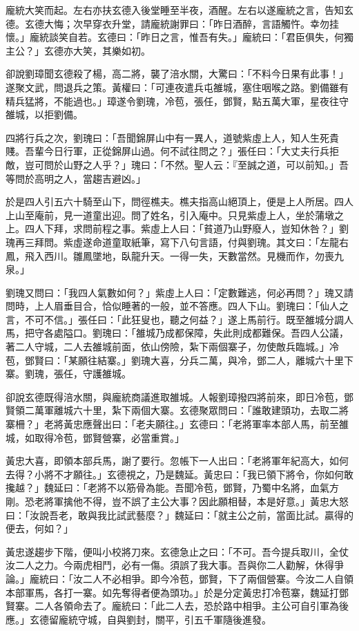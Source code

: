 龐統大笑而起。左右亦扶玄德入後堂睡至半夜，酒醒。左右以遂龐統之言，告知玄德。玄德大悔；次早穿衣升堂，請龐統謝罪曰：「昨日酒醉，言語觸忤。幸勿挂懷。」龐統談笑自若。玄德曰：「昨日之言，惟吾有失。」龐統曰：「君臣俱失，何獨主公？」玄德亦大笑，其樂如初。

卻說劉璋聞玄德殺了楊，高二將，襲了涪水關，大驚曰：「不料今日果有此事！」遂聚文武，問退兵之策。黃權曰：「可連夜遣兵屯雒城，塞住咽喉之路。劉備雖有精兵猛將，不能過也。」璋遂令劉瑰，冷苞，張任，鄧賢，點五萬大軍，星夜往守雒城，以拒劉備。

四將行兵之次，劉瑰曰：「吾聞錦屏山中有一異人，道號紫虛上人，知人生死貴賤。吾輩今日行軍，正從錦屏山過。何不試往問之？」張任曰：「大丈夫行兵拒敵，豈可問於山野之人乎？」瑰曰：「不然。聖人云：『至誠之道，可以前知。」吾等問於高明之人，當趨吉避凶。」

於是四人引五六十騎至山下，問徑樵夫。樵夫指高山絕頂上，便是上人所居。四人上山至庵前，見一道童出迎。問了姓名，引入庵中。只見紫虛上人，坐於蒲墩之上。四人下拜，求問前程之事。紫虛上人曰：「貧道乃山野廢人，豈知休咎？」劉瑰再三拜問。紫虛遂命道童取紙筆，寫下八句言語，付與劉瑰。其文曰：「左龍右鳳，飛入西川。雛鳳墜地，臥龍升天。一得一失，天數當然。見機而作，勿喪九泉。」

劉瑰又問曰：「我四人氣數如何？」紫虛上人曰：「定數難逃，何必再問？」瑰又請問時，上人眉垂目合，恰似睡著的一般，並不答應。四人下山。劉瑰曰：「仙人之言，不可不信。」張任曰：「此狂叟也，聽之何益？」遂上馬前行。既至雒城分調人馬，把守各處隘口。劉瑰曰：「雒城乃成都保障，失此則成都難保。吾四人公議，著二人守城，二人去雒城前面，依山傍險，紮下兩個寨子，勿使敵兵臨城。」冷苞，鄧賢曰：「某願往結寨。」劉瑰大喜，分兵二萬，與冷，鄧二人，離城六十里下寨。劉瑰，張任，守護雒城。

卻說玄德既得涪水關，與龐統商議進取雒城。人報劉璋撥四將前來，即日冷苞，鄧賢領二萬軍離城六十里，紮下兩個大寨。玄德聚眾問曰：「誰敢建頭功，去取二將寨柵？」老將黃忠應聲出曰：「老夫願往。」玄德曰：「老將軍率本部人馬，前至雒城，如取得冷苞，鄧賢營寨，必當重賞。」

黃忠大喜，即領本部兵馬，謝了要行。忽帳下一人出曰：「老將軍年紀高大，如何去得？小將不才願往。」玄德視之，乃是魏延。黃忠曰：「我已領下將令，你如何敢攙越？」魏延曰：「老將不以筋骨為能。吾聞冷苞，鄧賢，乃蜀中名將，血氣方剛。恐老將軍擒他不得，豈不誤了主公大事？因此願相替，本是好意。」黃忠大怒曰：「汝說吾老，敢與我比試武藝麼？」魏延曰：「就主公之前，當面比試。贏得的便去，何如？」

黃忠遂趨步下階，便叫小校將刀來。玄德急止之曰：「不可。吾今提兵取川，全仗汝二人之力。今兩虎相鬥，必有一傷。須誤了我大事。吾與你二人勸解，休得爭論。」龐統曰：「汝二人不必相爭。即今冷苞，鄧賢，下了兩個營寨。今汝二人自領本部軍馬，各打一寨。如先奪得者便為頭功。」於是分定黃忠打冷苞寨，魏延打鄧賢寨。二人各領命去了。龐統曰：「此二人去，恐於路中相爭。主公可自引軍為後應。」玄德留龐統守城，自與劉封，關平，引五千軍隨後進發。

